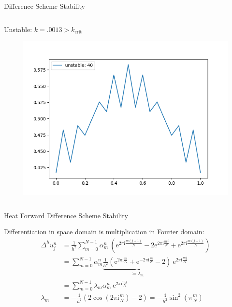 \documentclass[professionalfont]{beamer}
\theoremstyle{remark}
\newcommand{\e}{\mathrm{e}}
\renewcommand{\i}{\mathrm{i}}
\begin{document}
\begin{frame}{Difference Scheme Stability}
\begin{columns}
		\begin{column}{.45\paperwidth}
			\centering
			\small
			Unstable: $k=.0013>k_\text{crit}$
			\vspace{-10pt}
			\begin{figure}
				\centering
				\includegraphics[width = .3\paperwidth]{media/unstable.png}
			\end{figure}
		\end{column}

	\end{columns}

\end{frame}

\begin{frame}{Heat Forward Difference Scheme Stability}
	
	Differentiation in space domain is multiplication in Fourier domain:\begin{align*}
		\Delta^{h}u_{j}^{n}&=\frac{1}{h^2} \sum_{m=0}^{N-1}\alpha_{m}^{n}~\left(\e^{2\pi \i \frac{m(j + 1)}{N}}-2\e^{2\pi\i\frac{mj}{N}}+\e^{2\pi\i\frac{m(j-1)}{N}}\right)\\
		&=\sum_{m=0}^{N-1}\alpha_m^n\underbrace{\frac{1}{h^2}\left( \e^{2\pi\i\frac{m}{N}}+\e^{-2\pi\i\frac{m}{N}}-2 \right)}_{:=\lambda_m}~\e^{2\pi\i\frac{mj}{N}}\\
		&=\sum_{m=0}^{N-1}\lambda_m\alpha_m^n~\e^{2\pi\i\frac{mj}{N}}\\
		\lambda_m&=-\frac{1}{h^2}\left( 2\cos\left( 2\pi\i\frac{m}{N}\right)-2 \right)=-\frac{4}{h^2}\sin^2\left(\pi \frac{m}{N}\right)\tag{Amplification Factor}
	\end{align*}

\end{frame}
\end{document}
